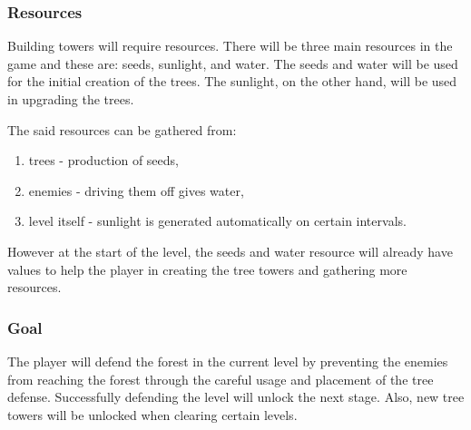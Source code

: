 \documentclass[journal]{./IEEE/IEEEtran}
\begin{document}
\subsubsection{Resources}
Building towers will require resources. There will be three main resources in the game and these are: seeds, sunlight, and water. The seeds and water will be used for the initial creation of the trees. The sunlight, on the other hand, will be used in upgrading the trees.

The said resources can be gathered from:
\begin{enumerate}
\item trees - production of seeds,
\item enemies - driving them off gives water,
\item level itself - sunlight is generated automatically on certain intervals.
\end{enumerate}

However at the start of the level, the seeds and water resource will already have values to help the player in creating the tree towers and gathering more resources. 

\subsubsection{Goal}
The player will defend the forest in the current level by preventing the enemies from reaching the forest through the careful usage and placement of the tree defense. Successfully defending the level will unlock the next stage. Also, new tree towers will be unlocked when clearing certain levels.
\end{document}
